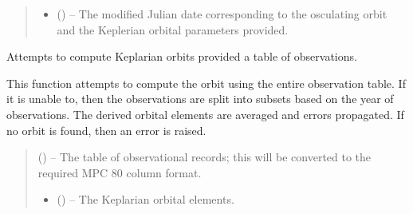 \documentclass[letterpaper,11pt,english]{sphinxmanual}
\begin{document}
\begin{savenotes}
\begin{fulllineitems}
\begin{savenotes}
\begin{fulllineitems}
\begin{quote}
\begin{description}
\begin{itemize}
\item {} 
\sphinxAtStartPar
{} () – The modified Julian date corresponding to the osculating orbit and
the Keplerian orbital parameters provided.

\end{itemize}


\end{description}\end{quote}

\end{fulllineitems}\end{savenotes}


\begin{savenotes}\begin{fulllineitems}
\label{\detokenize{code/opihiexarata.orbit.orbfit:opihiexarata.orbit.orbfit.OrbfitOrbitDeterminerEngine.solve_orbit}}
\pysigstartsignatures
{}
\pysigstopsignatures
\sphinxAtStartPar
Attempts to compute Keplarian orbits provided a table of observations.

\sphinxAtStartPar
This function attempts to compute the orbit using the entire
observation table. If it is unable to, then the observations are split
into subsets based on the year of observations. The derived orbital
elements are averaged and errors propagated. If no orbit is found,
then an error is raised.
\begin{quote}\begin{description}
\sphinxAtStartPar
{} () – The table of observational records; this will be converted to the
required MPC 80 column format.

\sphinxAtStartPar
\begin{itemize}
\item {} 
\sphinxAtStartPar
{} () – The Keplarian orbital elements.


\end{itemize}
\end{description}
\end{quote}
\end{fulllineitems}
\end{savenotes}
\end{fulllineitems}
\end{savenotes}
\end{document}
